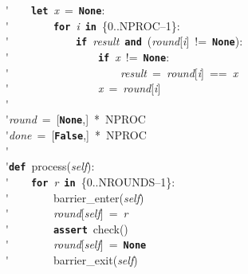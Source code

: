 \'\>~~~~\texttt{\textbf{let}}~\textit{x}~=~\texttt{\textbf{None}}:\\

\'\>~~~~~~~~\texttt{\textbf{for}}~\textit{i}~\texttt{\textbf{in}}~\{0..NPROC--1\}:\\

\'\>~~~~~~~~~~~~\texttt{\textbf{if}}~\textit{result}~\texttt{\textbf{and}}~(\textit{round}[\textit{i}]~!=~\texttt{\textbf{None}}):\\

\'\>~~~~~~~~~~~~~~~~\texttt{\textbf{if}}~\textit{x}~!=~\texttt{\textbf{None}}:\\

\'\>~~~~~~~~~~~~~~~~~~~~\textit{result}~=~\textit{round}[\textit{i}]~==~\textit{x}\\

\'\>~~~~~~~~~~~~~~~~\textit{x}~=~\textit{round}[\textit{i}]\\

\'\>\\

\'\>\textit{round}~=~[\texttt{\textbf{None}},]~*~NPROC\\

\'\>\textit{done}~=~[\texttt{\textbf{False}},]~*~NPROC\\

\'\>\\

\'\>\texttt{\textbf{def}}~process(\textit{self}):\\

\'\>~~~~\texttt{\textbf{for}}~\textit{r}~\texttt{\textbf{in}}~\{0..NROUNDS--1\}:\\

\'\>~~~~~~~~barrier\_enter(\textit{self})\\

\'\>~~~~~~~~\textit{round}[\textit{self}]~=~\textit{r}\\

\'\>~~~~~~~~\texttt{\textbf{assert}}~check()\\

\'\>~~~~~~~~\textit{round}[\textit{self}]~=~\texttt{\textbf{None}}\\

\'\>~~~~~~~~barrier\_exit(\textit{self})\\


